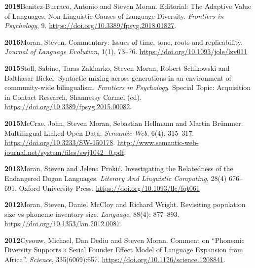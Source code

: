 \documentclass[11pt]{article}
\newcommand{\hangpara}{
 \setlength{\parindent}{0in} %
 \hangindent=0.42in %
}
\begin{document}
\vskip 6pt
\hangpara
{\bf 2018}\hspace{1ex}Benitez-Burraco, Antonio and Steven Moran. Editorial: The Adaptive Value of Languages: Non-Linguistic Causes of Language Diversity. \textit{Frontiers in Psychology}, 9. \url{https://doi.org/10.3389/fpsyg.2018.01827}.

\hangpara
\vskip 6pt
{\bf 2016}\hspace{1ex}Moran, Steven. Commentary: Issues of time, tone, roots and replicability. \textit{Journal of Language Evolution}, 1(1), 73--76. \url{https://doi.org/10.1093/jole/lzv011}

\vskip 6pt
\hangpara
{\bf 2015}\hspace{1ex}Stoll, Sabine, Taras Zakharko, Steven Moran, Robert Schikowski and Balthasar Bickel. Syntactic mixing across generations in an environment of community-wide bilingualism. \textit{Frontiers in Psychology}. Special Topic: Acquisition in Contact Research, Shannessy Carmel (ed). \url{https://doi.org/10.3389/fpsyg.2015.00082}. %

\hangpara
\vskip 6pt
{\bf 2015}\hspace{1ex}McCrae, John, Steven Moran, Sebastian Hellmann and Martin Brümmer. Multilingual Linked Open Data. \textit{Semantic Web}, 6(4), 315--317. \url{https://doi.org/10.3233/SW-150178}. \url{http://www.semantic-web-journal.net/system/files/swj1042\_0.pdf}.

\vskip 6pt
\hangpara
{\bf 2013}\hspace{1ex}Moran, Steven and Jelena Proki{\'c}. Investigating the Relatedness of the Endangered Dogon Languages. \textit{Literary And Linguistic Computing}, 28(4) 676--691. Oxford University Press. \url{https://doi.org/10.1093/llc/fqt061}

\vskip 6pt
\hangpara
{\bf 2012}\hspace{1ex}Moran, Steven, Daniel McCloy and Richard Wright. Revisiting population size vs phoneme inventory size. {\it Language}, 88(4): 877--893. \url{https://doi.org/10.1353/lan.2012.0087}. %

\vskip 6pt
\hangpara
{\bf 2012}\hspace{1ex}Cysouw, Michael, Dan Dediu and Steven Moran. Comment on ``Phonemic Diversity Supports a Serial Founder Effect Model of Language Expansion from Africa''. \textit{Science}, 335(6069):657. \url{https://doi.org/10.1126/science.1208841}.
\end{document}
